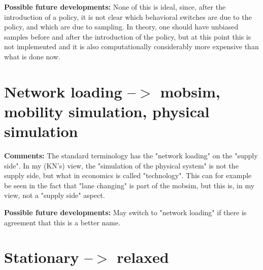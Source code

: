\documentclass[a4paper,11pt]{report}
\begin{document}
\textbf{Possible future developments:} None of this is  ideal,  since, after the introduction of a policy, it is not clear which   behavioral switches are due to the policy, and which are due to   sampling. In theory, one should have unbiased samples before and  after  the introduction of the policy, but at this point this is not   implemented and it is also computationally considerably more expensive   than what is done now.

\vfill\eject
\section{Network loading --$>$ mobsim, mobility simulation, physical simulation}



\textbf{Comments:} The standard terminology has the "network   loading" on the "supply  side". In my (KN's) view, the  "simulation of  the physical system" is  not the supply side, but what  in economics is  called "technology". This  can for example be  seen in the fact that  "lane changing" is part of the  mobsim, but this  is, in my view, not a  "supply side" aspect.

\textbf{Possible future developments:} May switch to "network loading" if there is agreement that this is a better name.

\vfill\eject
\section{Stationary --$>$ relaxed}

\end{document}
